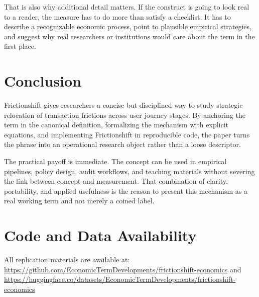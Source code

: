 \documentclass[12pt]{article}
\begin{document}
That is also why additional detail matters. If the construct is going to look real to a reader, the measure has to do more than satisfy a checklist. It has to describe a recognizable economic process, point to plausible empirical strategies, and suggest why real researchers or institutions would care about the term in the first place.

\section{Conclusion}
Frictionshift gives researchers a concise but disciplined way to study strategic relocation of transaction frictions across user journey stages. By anchoring the term in the canonical definition, formalizing the mechanism with explicit equations, and implementing Frictionshift in reproducible code, the paper turns the phrase into an operational research object rather than a loose descriptor.

The practical payoff is immediate. The concept can be used in empirical pipelines, policy design, audit workflows, and teaching materials without severing the link between concept and measurement. That combination of clarity, portability, and applied usefulness is the reason to present this mechanism as a real working term and not merely a coined label.

\section*{Code and Data Availability}
All replication materials are available at:
\url{https://github.com/EconomicTermDevelopments/frictionshift-economics} and
\url{https://huggingface.co/datasets/EconomicTermDevelopments/frictionshift-economics}
\end{document}
